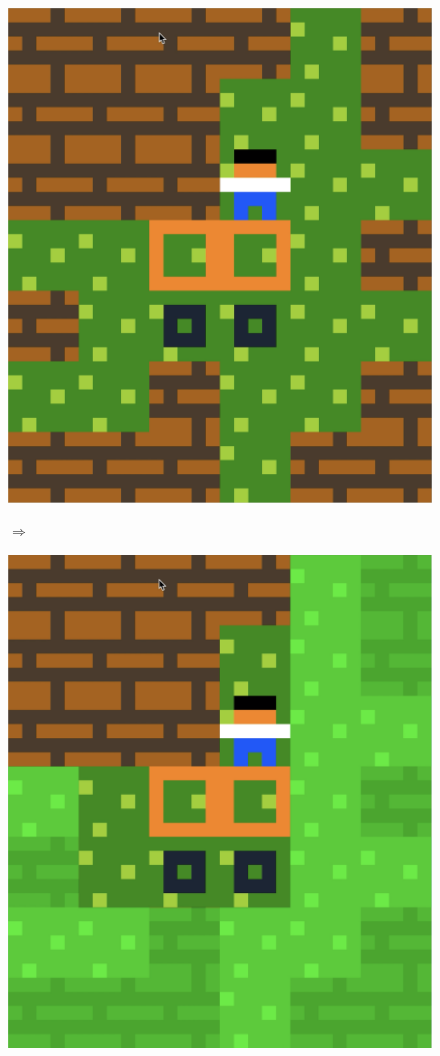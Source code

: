 \begin{figure}[!htbp]
\begin{minipage}[t]{0.2\textwidth}
\includegraphics[width=\textwidth]{figures/maxii5.png} \hfill \\
\end{minipage}
$\Longrightarrow$
\begin{minipage}[t]{0.2\textwidth}
\includegraphics[width=\textwidth]{figures/maxii6.png} \hfill \\

\end{minipage}
\end{figure}

